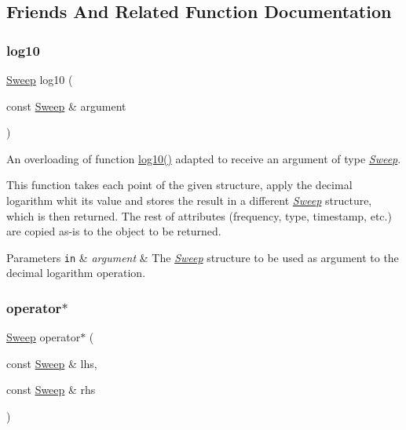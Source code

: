 \subsection{Friends And Related Function Documentation}
\mbox{\label{structSweep_a37df38f37b1cf6a6bfb18f44b706d308}} 
\subsubsection{\texorpdfstring{log10}{log10}}
{\footnotesize\ttfamily \hyperlink{structSweep}{Sweep} log10 (\begin{DoxyParamCaption}\item[{const \hyperlink{structSweep}{Sweep} \&}]{argument }\end{DoxyParamCaption})\hspace{0.3cm}{\ttfamily [friend]}}



An overloading of function {\ttfamily \hyperlink{structSweep_a37df38f37b1cf6a6bfb18f44b706d308}{log10()}} adapted to receive an argument of type {\itshape \hyperlink{structSweep}{Sweep}}. 

This function takes each point of the given structure, apply the decimal logarithm whit its value and stores the result in a different {\itshape \hyperlink{structSweep}{Sweep}} structure, which is then returned. The rest of attributes (frequency, type, timestamp, etc.) are copied as-\/is to the object to be returned. 
\begin{DoxyParams}[1]{Parameters}
\mbox{\tt in}  & {\em argument} & The {\itshape \hyperlink{structSweep}{Sweep}} structure to be used as argument to the decimal logarithm operation. \\
\hline
\end{DoxyParams}
\mbox{\label{structSweep_a4739da92a36e5f8f17b0be140dd327f6}} 
\subsubsection{\texorpdfstring{operator$\ast$}{operator*}\hspace{0.1cm}{\footnotesize\ttfamily [1/3]}}
{\footnotesize\ttfamily \hyperlink{structSweep}{Sweep} operator$\ast$ (\begin{DoxyParamCaption}\item[{const \hyperlink{structSweep}{Sweep} \&}]{lhs,  }\item[{const \hyperlink{structSweep}{Sweep} \&}]{rhs }\end{DoxyParamCaption})\hspace{0.3cm}{\ttfamily [friend]}}



